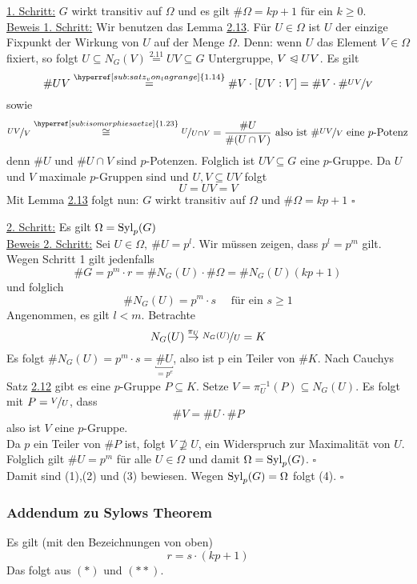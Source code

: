 \uline{1. Schritt:} $G$ wirkt transitiv auf $\Omega$ und es gilt $\#\Omega=kp+1$ für ein $k\ge0$.\\
\uline{Beweis 1. Schritt:} Wir benutzen das Lemma \hyperref[sub:lemma_3]{2.13}. Für $U\in \Omega$ ist $U$ der einzige Fixpunkt der Wirkung von $U$ auf der Menge $\Omega$. Denn: wenn $U$ das Element $V\in \Omega$ fixiert, so folgt $U\subseteq N_G(V)\stackrel{\hyperref[sub:def_normalisator]{2.11}}{=} UV\subseteq G$ Untergruppe, $V\trianglelefteqslant UV$. Es gilt \[\#UV\stackrel{\hyperref[sub:satz_von_lagrange]{1.14}}{=}\#V\cdot[UV:V]=\#V\cdot\#\nicefrac{UV}{V}\]
sowie \[ \nicefrac{UV}{V} \stackrel{\hyperref[sub:isomorphiesaetze]{1.23}}{\cong} \nicefrac{U}{U\cap V}= \frac{\#U}{\#(U\cap V)}\text{ also ist }\#\nicefrac{UV}{V} \text{ eine $p$-Potenz} 
\]
denn $\#U$ und $\#U\cap V$ sind $p$-Potenzen. Folglich ist $UV\subseteq G$ eine $p$-Gruppe. Da $U$ und $V$ maximale $p$-Gruppen sind und $U,V\subseteq UV$ folgt \[U=UV=V \]
Mit Lemma \hyperref[sub:lemma_3]{2.13} folgt nun: $G$ wirkt transitiv auf $\Omega$ und $\#\Omega=kp+1$
\hfill $\square$

\uline{2. Schritt:} Es gilt $\Omega=\operatorname{Syl}_p(G)$\\
\uline{Beweis 2. Schritt:} Sei $U\in \Omega,~\#U=p^l$. Wir müssen zeigen, dass $p^l=p^m$ gilt.\\
Wegen Schritt 1 gilt jedenfalls 
\[\#G=p^m\cdot r= \#N_G(U)\cdot \#\Omega= \#N_G(U)(kp+1) \tag*{$(\ast)$} \]
und folglich 
\[\#N_G(U)=p^m\cdot s \quad \text{ für ein } s\ge 1 \tag*{$(\ast\ast)$} \]
Angenommen, es gilt $l<m$. Betrachte \[N_G(U)\stackrel{\pi_U}{\to}\nicefrac{N_G(U)}{U}=K \]
Es folgt $\#N_G(U)=p^m\cdot s=\underbracket{\#U}_{=p^e}$, also ist p ein Teiler von $\#K$. Nach Cauchys Satz \hyperref[sub:cauchys_satz]{2.12} gibt es eine $p$-Gruppe $P\subseteq K$. Setze $V=\pi_U^{-1}(P)\subseteq N_G(U)$. Es folgt mit $P=\nicefrac{V}{U}$, dass \[\#V=\#U\cdot \#P \]
also ist $V$ eine $p$-Gruppe.\\
Da $p$ ein Teiler von $\#P$ ist, folgt $V\nsupseteq U$, ein Widerspruch zur Maximalität von $U$.\\
Folglich gilt $\#U=p^m$ für alle $U\in \Omega$ und damit $\Omega=\operatorname{Syl}_p(G)$.
\hfill $\square$
\\

Damit sind (1),(2) und (3) bewiesen. Wegen $\operatorname{Syl}_p(G)=\Omega$ folgt (4).
\hfill $\square$

\subsubsection*{Addendum zu Sylows Theorem}
Es gilt (mit den Bezeichnungen von oben) \[r=s\cdot(kp+1) \]
Das folgt aus $(\ast)$ und $(\ast\ast)$.


